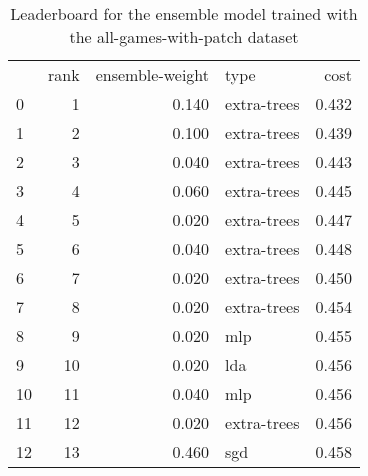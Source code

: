 \begin{table}[]
	\centering
	\begin{tabular}{lrrlr}
		   & rank & ensemble-weight & type        & cost  \\
		0  & 1    & 0.140           & extra-trees & 0.432 \\
		1  & 2    & 0.100           & extra-trees & 0.439 \\
		2  & 3    & 0.040           & extra-trees & 0.443 \\
		3  & 4    & 0.060           & extra-trees & 0.445 \\
		4  & 5    & 0.020           & extra-trees & 0.447 \\
		5  & 6    & 0.040           & extra-trees & 0.448 \\
		6  & 7    & 0.020           & extra-trees & 0.450 \\
		7  & 8    & 0.020           & extra-trees & 0.454 \\
		8  & 9    & 0.020           & mlp         & 0.455 \\
		9  & 10   & 0.020           & lda         & 0.456 \\
		10 & 11   & 0.040           & mlp         & 0.456 \\
		11 & 12   & 0.020           & extra-trees & 0.456 \\
		12 & 13   & 0.460           & sgd         & 0.458 \\
	\end{tabular}

	\caption{Leaderboard for the ensemble model trained with the all-games-with-patch dataset}
	\label{tab:lb-all-games-with-patch-autoencode}
\end{table}

